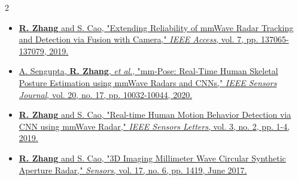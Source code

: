 \documentclass[10pt,letter,ragged2e,withhyper]{leozhang}
\newcommand{\etal}{\textit{et al}.}
\begin{document}
\begin{paracol}{2}




\begin{itemize}
  \item \href{https://ieeexplore.ieee.org/document/8844649}{{\bf R. Zhang} and S. Cao, "Extending Reliability of mmWave Radar Tracking and Detection via Fusion with Camera," {\it IEEE Access}, vol. 7, pp. 137065-137079, 2019.}
  \item \href{https://ieeexplore.ieee.org/document/9083948}{A. Sengupta, {\bf R. Zhang}, \etal{}, "mm-Pose: Real-Time Human Skeletal Posture Estimation using mmWave Radars and CNNs," {\it IEEE Sensors Journal}, vol. 20, no. 17, pp. 10032-10044, 2020.}
  \item \href{https://ieeexplore.ieee.org/document/8585077}{{\bf R. Zhang} and S. Cao, "Real-time Human Motion Behavior Detection via CNN using mmWave Radar," {\it IEEE Sensors Letters}, vol. 3, no. 2, pp. 1-4, 2019.}
  \item \href{http://www.mdpi.com/1424-8220/17/6/1419}{{\bf R. Zhang} and S. Cao, "3D Imaging Millimeter Wave Circular Synthetic Aperture Radar," {\it Sensors}, vol. 17, no. 6, pp. 1419, June 2017.}
\end{itemize}
\divider


\end{paracol}
\end{document}

